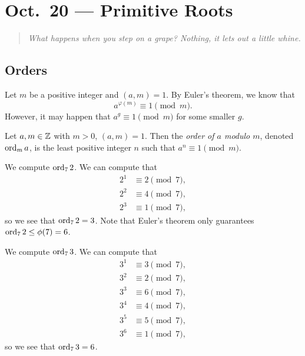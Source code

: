 \chapter{Oct.~20 --- Primitive Roots}

\begin{quote}
  \emph{
  What happens when you step on a grape?
Nothing, it lets out a little whine.}
\end{quote}

\section{Orders}

\begin{remark}
  Let $m$ be a positive integer and
  $(a, m) = 1$. By Euler's theorem, we know
  that
  \[
    a^{\varphi(m)} \equiv 1 \pmod{m}.
  \]
  However, it may happen that
  $a^g \equiv 1 \pmod{m}$ for some smaller
  $g$.
\end{remark}

\begin{definition}
  Let $a, m \in \mathbb{Z}$ with $m > 0$,
  $(a, m) = 1$. Then the \emph{order of $a$ modulo $m$},
  denoted $\operatorname{ord}_m a$, is the least
  positive integer $n$ such that
  $a^n \equiv 1 \pmod{m}$.
\end{definition}

\begin{example}
  We compute $\operatorname{ord}_7 2$. We can compute that
  \begin{align*}
    2^1 &\equiv 2 \pmod{7},\\
    2^2 &\equiv 4 \pmod{7},\\
    2^3 &\equiv 1 \pmod{7},
  \end{align*}
  so we see that $\operatorname{ord}_7 2 = 3$. Note
  that Euler's theorem only guarantees
  $\operatorname{ord}_7 2 \le \phi(7) = 6$.
\end{example}

\begin{example}\label{ex:order-7-3}
  We compute $\operatorname{ord}_7 3$. We can compute
  that
  \begin{align*}
    3^1 &\equiv 3 \pmod{7},\\
    3^2 &\equiv 2 \pmod{7},\\
    3^3 &\equiv 6 \pmod{7},\\
    3^4 &\equiv 4 \pmod{7},\\
    3^5 &\equiv 5 \pmod{7},\\
    3^6 &\equiv 1 \pmod{7},
  \end{align*}
  so we see that $\operatorname{ord}_7 3 = 6$.
\end{example}

